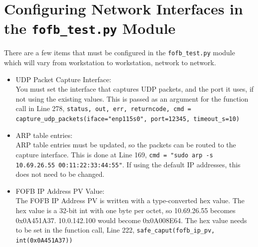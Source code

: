 \section{Configuring Network Interfaces in the \texttt{fofb\_test.py} Module}
There are a few items that must be configured in the \texttt{fofb\_test.py} module which will vary from workstation to workstation, network to network. 
\begin{itemize}
	\item UDP Packet Capture Interface:\\
	You must set the interface that captures UDP packets, and the port it uses, if not using the existing values. This is passed as an argument for the function call in Line 278, \texttt{status, out, err, returncode, cmd = capture\_udp\_packets(iface="enp115s0", port=12345, timeout\_s=10)}
	\item ARP table entries:\\
	ARP table entries must be updated, so the packets can be routed to the capture interface. This is done at Line 169, \texttt{cmd = "sudo arp -s 10.69.26.55 00:11:22:33:44:55"}. If using the default IP addresses, this does not need to be changed. 
	\item FOFB IP Address PV Value:\\
	The FOFB IP Address PV is written with a type-converted hex value. The hex value is a 32-bit int with one byte per octet, so 10.69.26.55 becomes 0x0A451A37. 10.0.142.100 would become 0x0A008E64. The hex value needs to be set in the function call, Line 222, \texttt{safe\_caput(fofb\_ip\_pv, int(0x0A451A37))}
\end{itemize} 
